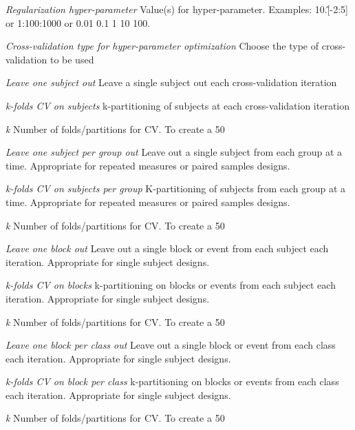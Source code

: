 \textsl{Regularization hyper-parameter}
Value(s) for hyper-parameter. Examples: 10.\^[-2:5] or 1:100:1000 or 0.01 0.1 1 10 100.


\textsl{Cross-validation type for hyper-parameter optimization}
Choose the type of cross-validation to be used


\textit{Leave one subject out}
Leave a single subject out each cross-validation iteration


\textit{k-folds CV on subjects}
k-partitioning of subjects at each cross-validation iteration


\textit{k}
Number of folds/partitions for CV. To create a 50%


\textit{Leave one subject per group out}
Leave out a single subject from each group at a time. Appropriate for repeated measures or paired samples designs.


\textit{k-folds CV on subjects per group}
K-partitioning of subjects from each group at a time. Appropriate for repeated measures or paired samples designs.


\textit{k}
Number of folds/partitions for CV. To create a 50%


\textit{Leave one block out}
Leave out a single block or event from each subject each iteration. Appropriate for single subject designs.


\textit{k-folds CV on blocks}
k-partitioning on blocks or events from each subject each iteration. Appropriate for single subject designs.


\textit{k}
Number of folds/partitions for CV. To create a 50%


\textit{Leave one block per class out}
Leave out a single block or event from each class each iteration. Appropriate for single subject designs.


\textit{k-folds CV on block per class}
k-partitioning on blocks or events from each class each iteration. Appropriate for single subject designs.


\textit{k}
Number of folds/partitions for CV. To create a 50%


